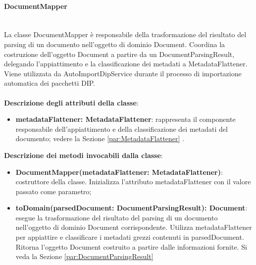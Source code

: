 \documentclass[a4paper,12pt]{article}
\begin{document}
{                \paragraph{DocumentMapper}\label{par:DocumentMapper}\mbox{}\\
                La classe DocumentMapper è responsabile della trasformazione del risultato del parsing di un documento nell'oggetto di dominio Document. Coordina la costruzione dell'oggetto Document a partire da un DocumentParsingResult, delegando l'appiattimento e la classificazione dei metadati a MetadataFlattener. Viene utilizzata da AutoImportDipService durante il processo di importazione automatica dei pacchetti DIP.\\
                \\
                \textbf{Descrizione degli attributi della classe}:
                \begin{itemize}
                    \item \textbf{metadataFlattener: MetadataFlattener}: rappresenta il componente responsabile dell'appiattimento e della classificazione dei metadati del documento; vedere la Sezione \ref{par:MetadataFlattener} .
                \end{itemize}
 
                \noindent \textbf{Descrizione dei metodi invocabili dalla classe}:
                \begin{itemize}
                    \item \textbf{DocumentMapper(metadataFlattener: MetadataFlattener)}: costruttore della classe. Inizializza l'attributo metadataFlattener con il valore passato come parametro;
                    \item \textbf{toDomain(parsedDocument: DocumentParsingResult): Document}: esegue la trasformazione del risultato del parsing di un documento nell'oggetto di dominio Document corrispondente. Utilizza metadataFlattener per appiattire e classificare i metadati grezzi contenuti in parsedDocument. Ritorna l'oggetto Document costruito a partire dalle informazioni fornite. Si veda la Sezione \ref{par:DocumentParsingResult}
                \end{itemize}

}
\end{document}
